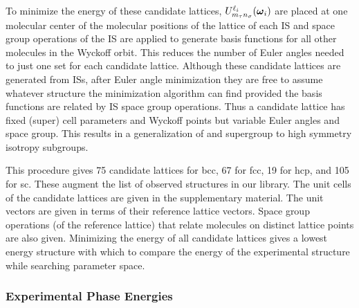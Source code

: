 \documentclass[preprint]{revtex4}
\newcommand{\mb}[1]{\ensuremath{\mbox{\boldmath $ #1 $}}}
\begin{document}
To minimize the energy of these candidate lattices,
$U^{\ell_i}_{m_\tau n_\sigma}(\mb{\omega}_i)$ are placed at one
molecular center of the molecular positions of the lattice of each
IS and space group operations of the IS are applied to generate
basis functions for all other molecules in the Wyckoff orbit. This
reduces the number of Euler angles needed to just one set for each
candidate lattice. Although these candidate lattices are generated
from ISs, after Euler angle minimization they are free to assume
whatever structure the minimization algorithm can find provided the
basis functions are related by IS space group operations. Thus a
candidate lattice has fixed (super) cell parameters and Wyckoff
points but variable Euler angles and space group. This results in a
generalization of and supergroup to high symmetry isotropy
subgroups.

This procedure gives 75 candidate lattices for bcc, 67 for fcc, 19
for hcp, and 105 for sc. These augment the list
of observed structures in our library. The unit cells of the
candidate lattices are given in the supplementary material. The unit
vectors are given in terms of their reference lattice vectors. Space
group operations (of the reference lattice) that relate molecules on
distinct lattice points are also given. Minimizing the energy of all
candidate lattices gives a lowest energy structure with which to
compare the energy of the experimental structure while searching
parameter space.


\subsubsection{Experimental Phase Energies}
\end{document}

